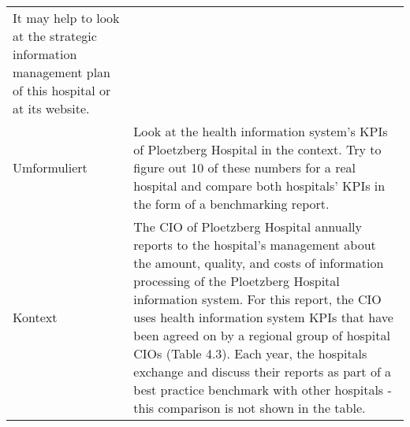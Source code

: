 \begin{landscape}
\begin{longtable}{p{3cm}p{}}
    It may help to look at the strategic information management plan of this hospital or at its website.\\
    Umformuliert & Look at the health information system's KPIs of Ploetzberg Hospital in the context.
    Try to figure out 10 of these numbers for a real hospital and compare both hospitals' KPIs in the form of a benchmarking report.\\
    Kontext & The CIO of Ploetzberg Hospital annually reports to the hospital's management about the amount, quality, and costs of information processing of the Ploetzberg Hospital information system.
    For this report, the CIO uses health information system KPIs that have been agreed on by a regional group of hospital CIOs (Table 4.3). Each year, the hospitals exchange and discuss their reports as part of a best practice benchmark with other hospitals - this comparison is not shown in the table.


\end{longtable}
\end{landscape}
